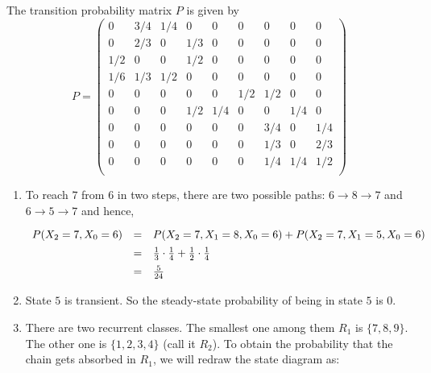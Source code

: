 \documentclass[12pt, oneside]{article}
\begin{document}
\begin{enumerate}
The transition probability matrix $P$ is given by
\[ P = 
\begin{pmatrix}
0   & 3/4 & 1/4 & 0   & 0   & 0   & 0   & 0   & 0   \\
0   & 2/3 & 0   & 1/3 & 0   & 0   & 0   & 0   & 0   \\
1/2 & 0   & 0   & 1/2 & 0   & 0   & 0   & 0   & 0   \\
1/6 & 1/3 & 1/2 & 0   & 0   & 0   & 0   & 0   & 0   \\
0   & 0   & 0   & 0   & 0   & 1/2 & 1/2 & 0   & 0   \\
0   & 0   & 0   & 1/2 & 1/4 & 0   & 0   & 1/4 & 0   \\
0   & 0   & 0   & 0   & 0   & 0   & 3/4 & 0   & 1/4 \\
0   & 0   & 0   & 0   & 0   & 0   & 1/3 & 0   & 2/3 \\
0   & 0   & 0   & 0   & 0   & 0   & 1/4 & 1/4 & 1/2 \\
\end{pmatrix}
\]

\begin{enumerate}[label=(\alph*)]
\item 
        To reach $7$ from $6$ in two steps, there are two possible paths: $6\rightarrow8\rightarrow7$ and $6\rightarrow5\rightarrow7$ and hence,
        \[\def\arraystretch{1.4}
            \begin{array}{lcl}
            P(X_2=7,X_0=6) & = &  P(X_2=7,X_1=8,X_0=6) + P(X_2=7,X_1=5,X_0=6) \\
            ~ & = & \frac 1 3 \cdot \frac 1 4 + \frac 1 2 \cdot \frac 1 4 \\
            ~ & = & \frac{5}{24}
            \end{array}
        \]

\item State $5$ is transient. So the steady-state probability of being in state $5$ is $0$.

\item 
        There are two recurrent classes. The smallest one among them $R_1$ is $\{7,8,9\}$. The other one is $\{1,2,3,4\}$ (call it $R_2$).
        To obtain the probability that the chain gets absorbed in $R_1$, we will redraw the state diagram as:
        
        \begin{figure}[!h]
        \centering
\end{figure}
\end{enumerate}
\end{enumerate}
\end{document}

